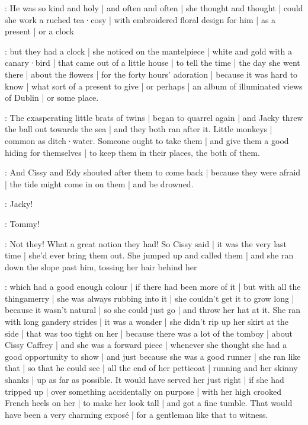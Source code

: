\gertyRomantic:
He was so kind and holy |
and often and often |
she thought and thought |%
could she work a ruched tea·cosy |
with embroidered floral design for him |
as a present |
or a clock

\gertyReal:
but they had a clock |
she noticed on the mantelpiece |
white and gold with a canary·bird |
that came out of a little house |
to tell the time |
the day she went there |
about the flowers |
for the forty hours' adoration |
because it was hard to know |
what sort of a present to give |
or perhaps |
an album of illuminated views of Dublin |
or some place.

\gertyJudgy:
The exasperating little brats of twins |
began to quarrel again |
and Jacky threw the ball out towards the sea |
and they both ran after it.
Little monkeys |
common as ditch·water.
Someone ought to take them |
and give them a good hiding for themselves |
to keep them in their places,
the both of them.%

:
And Cissy and Edy shouted after them to come back |
because they were afraid |
the tide might come in on them |
and be drowned.

\cissy:
Jacky!

\edy:
Tommy!

:
Not they!
What a great notion they had!
So Cissy said |
it was the very last time |
she'd ever bring them out.
She jumped up and called them |
and she ran down the slope past him,
tossing her hair behind her

\gertyJudgy:
which had a good enough colour |
if there had been more of it |
but with all the thingamerry |
she was always rubbing into it |
she couldn't get it to grow long |
because it wasn't natural |
so she could just go |
and throw her hat at it.
She ran with long gandery strides |
it was a wonder |
she didn't rip up her skirt at the side |
that was too tight on her |%
because there was a lot of the tomboy |
about Cissy Caffrey |
and she was a forward piece |
whenever she thought
she had a good opportunity to show |
and just because she was a good runner |
she ran like that |
so that he could see |
all the end of her petticoat |
running and her skinny shanks |
up as far as possible.
It would have served her just right |
if she had tripped up |
over something accidentally on purpose |
with her high crooked French heels on her |
to make her look tall |
and got a fine tumble.
That would have been
a very charming exposé |
for a gentleman like that
to witness.

